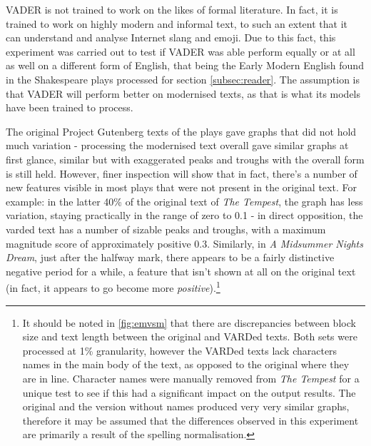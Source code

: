 \documentclass{article}
\begin{document}
{        VADER is not trained to work on the likes of formal literature. In fact, it is trained to work on highly modern and informal text, to such an extent that it can understand and analyse Internet slang and emoji. Due to this fact, this experiment was carried out to test if VADER was able perform equally or at all as well on a different form of English, that being the Early Modern English found in the Shakespeare plays processed for section \ref{subsec:reader}. The assumption is that VADER will perform better on modernised texts, as that is what its models have been trained to process.
        
        The original Project Gutenberg texts of the plays gave graphs that did not hold much variation - processing the modernised text overall gave similar graphs at first glance, similar but with exaggerated peaks and troughs with the overall form is still held. However, finer inspection will show that in fact, there's a number of new features visible in most plays that were not present in the original text. For example: in the latter 40\% of the original text of \textit{The Tempest}, the graph has less variation, staying practically in the range of zero to 0.1 - in direct opposition, the varded text has a number of sizable peaks and troughs, with a maximum magnitude score of approximately positive 0.3. Similarly, in \textit{A Midsummer Nights Dream}, just after the halfway mark, there appears to be a fairly distinctive negative period for a while, a feature that isn't shown at all on the original text (in fact, it appears to go become more \textit{positive}).\footnote{It should be noted in \ref{fig:emvsm} that there are discrepancies between block size and text length between the original and VARDed texts. Both sets were processed at 1\% granularity, however the VARDed texts lack characters names in the main body of the text, as opposed to the original where they are in line. Character names were manually removed from \textit{The Tempest} for a unique test to see if this had a significant impact on the output results. The original and the version without names produced very very similar graphs, therefore it may be assumed that the differences observed in this experiment are primarily a result of the spelling normalisation.}

}
\end{document}
